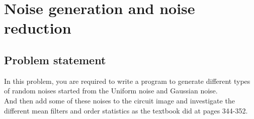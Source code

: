 \chapter{Noise generation and noise reduction}

\section{Problem statement}

In this problem, you are required to write a program to generate different types
of random noises started from the Uniform noise and Gaussian noise. \\
And then add some of these noises to the circuit image and investigate the different
mean filters and order statistics as the textbook did at pages 344-352.
